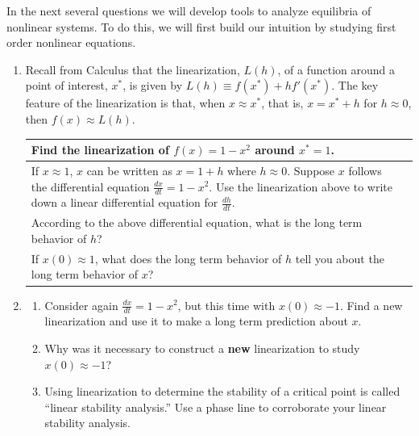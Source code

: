 
In the next several questions we will develop tools to analyze equilibria of nonlinear systems.  To do this, we will first build our intuition by studying first order nonlinear equations.  

\begin{enumerate}[resume]
\item Recall from Calculus that the linearization, $L(h)$, of a function around a point of interest, $x^*$, is given by $L(h) \equiv f(x^*) + hf'(x^*)$. The key feature of the linearization is that, when $x \approx x^*$, that is, $x=x^*+h$ for $h \approx 0$, then $f(x) \approx L(h)$. \label{14problem7}

\begin{tabular}{|p{2.5in}|p{3in}|}
\hline
Find the linearization of $f(x)=1-x^2$ around $x^*=1$. \vspace{1.25in} &  \\ \hline
If $x \approx 1$, $x$ can be written as $x=1+h$ where $h \approx 0$. Suppose $x$ follows the differential equation $\frac{dx}{dt}=1-x^2$. Use the linearization above to write down a linear differential equation for $\frac{dh}{dt}$. \vspace{1.25in} &  \\ \hline
According to the above differential equation, what is the long term behavior of $h$? &  \\ \hline
If $x(0) \approx 1$, what does the long term behavior of $h$ tell you about the long term behavior of $x$? &  \\ \hline
\end{tabular}

\item \label{14problem8}
\begin{enumerate}
\item Consider again $\displaystyle\frac{dx}{dt}=1-x^2$, but this time with $x(0) \approx -1$. Find a new linearization and use it to make a long term prediction about $x$. \label{14problem8parta} \vfill

\clearpage

\item Why was it necessary to construct a \textbf{new} linearization to study $x(0) \approx -1$? \label{14problerm8partb} \vfill

\item Using linearization to determine the stability of a critical point is called ``linear stability analysis.'' Use a phase line to corroborate your linear stability analysis. \label{14problem8partc} \vfill


\end{enumerate}
\end{enumerate}
